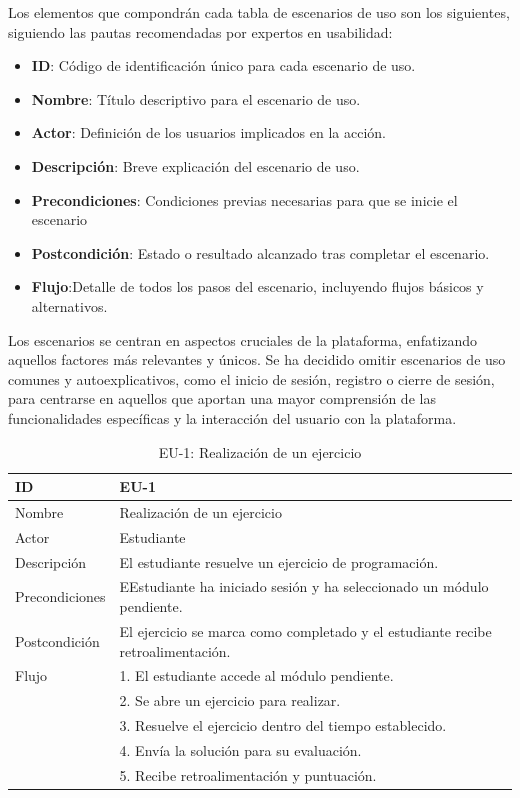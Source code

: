 Los elementos que compondrán cada tabla de escenarios de uso son los siguientes, siguiendo las pautas recomendadas por expertos en usabilidad:

\begin{itemize}
    \item \textbf{ID}: Código de identificación único para cada escenario de uso.
    \item \textbf{Nombre}: Título descriptivo para el escenario de uso.
    \item \textbf{Actor}: Definición de los usuarios implicados en la acción.
    \item \textbf{Descripción}: Breve explicación del escenario de uso. 
    \item \textbf{Precondiciones}: Condiciones previas necesarias para que se inicie el escenario
    \item \textbf{Postcondición}: Estado o resultado alcanzado tras completar el escenario.
    \item \textbf{Flujo}:Detalle de todos los pasos del escenario, incluyendo flujos básicos y alternativos.
\end{itemize}

Los escenarios se centran en aspectos cruciales de la plataforma, enfatizando aquellos factores más relevantes y únicos. Se ha decidido omitir escenarios de uso comunes y autoexplicativos, como el inicio de sesión, registro o cierre de sesión, para centrarse en aquellos que aportan una mayor comprensión de las funcionalidades específicas y la interacción del usuario con la plataforma.

\begin{table}[H]
    \centering
    \begin{tabularx}{\textwidth}{|l|X|}
    \hline
    ID & EU-1 \\
    \hline
    Nombre & Realización de un ejercicio \\
    \hline
    Actor & Estudiante \\
    \hline
    Descripción & El estudiante resuelve un ejercicio de programación. \\
    \hline
    Precondiciones & EEstudiante ha iniciado sesión y ha seleccionado un módulo pendiente. \\
    \hline
    Postcondición & El ejercicio se marca como completado y el estudiante recibe retroalimentación. \\
    \hline
    Flujo & 
    1. El estudiante accede al módulo pendiente. \\
    & 2. Se abre un ejercicio para realizar. \\
    & 3. Resuelve el ejercicio dentro del tiempo establecido. \\
    & 4. Envía la solución para su evaluación. \\
    & 5. Recibe retroalimentación y puntuación. \\
    \hline
    \end{tabularx}
    \caption{EU-1: Realización de un ejercicio}
\end{table}

